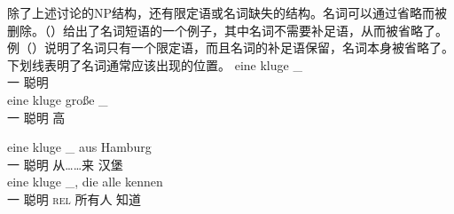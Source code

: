 除了上述讨论的NP结构，还有限定语或名词缺失的结构。名词可以通过省略而被删除。（）给出了名词短语的一个例子，其中名词不需要补足语，从而被省略了。例（）说明了名词只有一个限定语，而且名词的补足语保留，名词本身被省略了。下划线表明了名词通常应该出现的位置。
\eal
\label{ex-nounless-np}
\ex 
\gll eine kluge \_\\
	 一 聪明\\
\ex 
\gll eine kluge große \_\\
     一    聪明 高\\

\ex 
\gll eine kluge \_ aus Hamburg\\
	 一 聪明 {} 从……来 汉堡\\
\ex 
\gll eine kluge \_, die alle kennen\\
	 一 聪明 {} \textsc{rel} 所有人 知道\\
\zl

